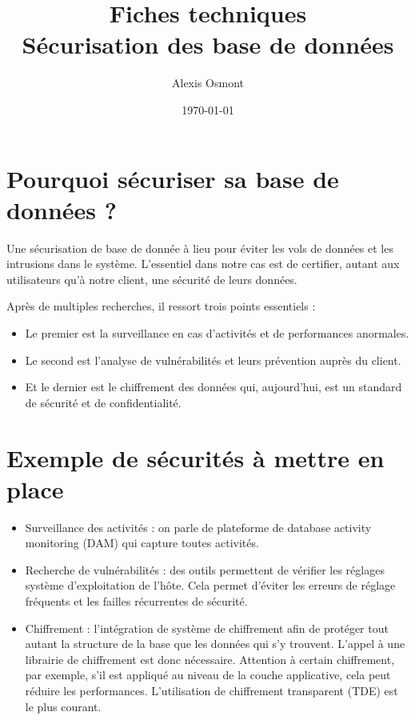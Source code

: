 \documentclass{article}
\title{
    \Huge
    Fiches techniques\\
    Sécurisation des base de données
}
\author{\huge Alexis Osmont}
\date{\huge \today}
\begin{document}
\maketitle
\newpage

\section{Pourquoi sécuriser sa base de données ?}                                                                                 
Une sécurisation de base de donnée à lieu pour éviter les vols de données et les intrusions dans le système. L’essentiel dans notre cas est de certifier, autant aux utilisateurs qu’à notre client, une sécurité de leurs données.

Après de multiples recherches, il ressort trois points essentiels : 
\begin{itemize}
    \item Le premier est la surveillance en cas d’activités et de performances anormales.
    \item Le second est l’analyse de vulnérabilités et leurs prévention auprès du client.
    \item Et le dernier est le chiffrement des données qui, aujourd’hui, est un standard de sécurité et de confidentialité.
\end{itemize}

\section{Exemple de sécurités à mettre en place}

\begin{itemize}
    \item Surveillance des activités : on parle de plateforme de database activity monitoring (DAM) qui capture toutes activités.
    \item Recherche de vulnérabilités :  des outils permettent de vérifier les réglages système d’exploitation de l’hôte. Cela permet d’éviter les erreurs de réglage fréquents et les failles récurrentes de sécurité.
    \item Chiffrement :  l’intégration de système de chiffrement afin de protéger tout autant la structure de la base que les données qui s’y trouvent. L’appel à une librairie de chiffrement est donc nécessaire. Attention à certain chiffrement, par exemple, s'il est appliqué au niveau de la couche applicative, cela peut réduire les performances. L’utilisation de chiffrement transparent (TDE) est le plus courant.
\end{itemize}
\end{document}
